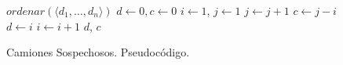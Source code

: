 \begin{center}
\begin{figure}
    \begin{pseudo}
            \State $ordenar(\langle d_1, \ldots, d_n \rangle)$ 
            \State $d \leftarrow 0, c \leftarrow 0$ 
            \State $i \leftarrow 1$, $j \leftarrow 1$ 
             
                 
                    \State $j \leftarrow j + 1$ 
                \EndWhile
                 
                    \State $c \leftarrow j - i$ 
                    \State $d \leftarrow i$ 
                \EndIf
                \State $i \leftarrow i + 1$ 
            \EndWhile
            \Return $d$, $c$
        \EndProcedure
    \end{pseudo}
    \caption{Camiones Sospechosos. Pseudocódigo.}
    \label{problema1-pseudo}
\end{figure}
\end{center}
